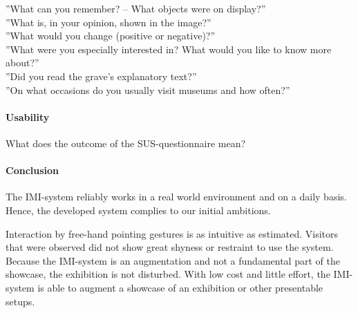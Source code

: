 ''What can you remember? -- What objects were on display?''
\\
''What is, in your opinion, shown in the image?''
\\
''What would you change (positive or negative)?''
\\
''What were you especially interested in? What would you like to know more about?''
\\
''Did you read the grave's explanatory text?''
\\
''On what occasions do you usually visit museums and how often?''


\paragraph{Usability}

What does the outcome of the \ac{SUS}-questionnaire mean?


\paragraph{Conclusion}

The \ac{IMI}-system reliably works in a real world environment and on a daily basis. Hence, the developed system complies to our initial ambitions.

Interaction by free-hand pointing gestures is as intuitive as estimated. Visitors that were observed did not show great shyness or restraint to use the system. Because the \ac{IMI}-system is an augmentation and not a fundamental part of the showcase, the exhibition is not disturbed. With low cost and little effort, the \ac{IMI}-system is able to augment a showcase of an exhibition or other presentable setups.



%
